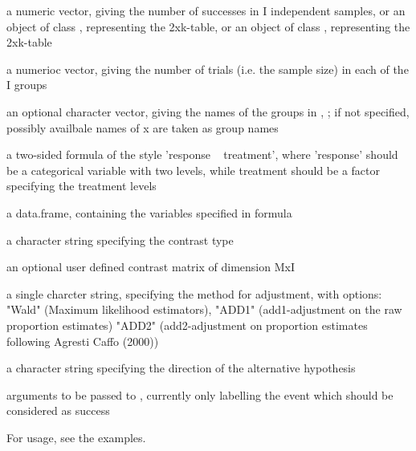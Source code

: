 \begin{Arguments}
\begin{ldescription}
\item[\code{x}] a numeric vector, giving the number of successes in I independent samples,
or an object of class , representing the 2xk-table,
or an object of class , representing the 2xk-table

\item[\code{n}] a numerioc vector, giving the number of trials (i.e. the sample size) in each of the I groups 
\item[\code{names}] an optional character vector, giving the names of the groups in , ; if not specified, possibly availbale names of x are taken as group names
\item[\code{formula}] a two-sided formula of the style 'response ~ treatment', where 'response' should be a categorical variable with two levels,
while treatment should be a factor specifying the treatment levels
\item[\code{data}] a data.frame, containing the variables specified in formula
\item[\code{type}] a character string specifying the contrast type 
\item[\code{cmat}] an optional user defined contrast matrix of dimension MxI
\item[\code{method}] a single charcter string, specifying the method for adjustment,
with options: "Wald" (Maximum likelihood estimators),
"ADD1" (add1-adjustment on the raw proportion estimates)
"ADD2" (add2-adjustment on proportion estimates following Agresti Caffo (2000))

\item[\code{alternative}] a character string specifying the direction of the alternative hypothesis
\item[\code{...}] arguments to be passed to , currently only  labelling the event which should be considered as success
\end{ldescription}
\end{Arguments}
\begin{Details}\relax
For usage, see the examples.
\end{Details}
